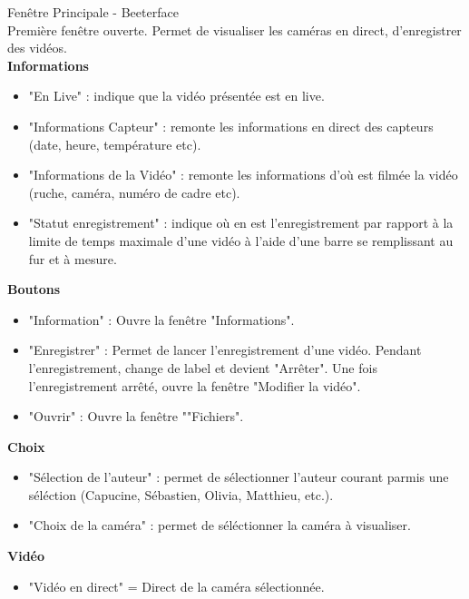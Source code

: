 \documentclass[11pt,french,a4paper]{report}
\begin{document}
\Large Fenêtre Principale - Beeterface \normalsize \\
    Première fenêtre ouverte. Permet de visualiser les caméras en direct, d'enregistrer
    des vidéos. \\
            \large \textbf{Informations} \normalsize
     \begin{itemize}[label=, leftmargin=*,parsep=0cm,itemsep=0cm,topsep=0cm]
        \item "En Live" : indique que la vidéo présentée est en live.
        \item "Informations Capteur" : remonte les informations en direct des capteurs (date, heure, température etc).
        \item "Informations de la Vidéo" : remonte les informations d'où est filmée la vidéo (ruche, caméra, numéro de cadre etc).
        \item "Statut enregistrement" : indique où en est l'enregistrement par rapport à la limite de temps maximale d'une vidéo à
               l'aide d'une barre se remplissant au fur et à mesure.
    \end{itemize}
            \large \textbf{Boutons} \normalsize
     \begin{itemize}[label=, leftmargin=*,parsep=0cm,itemsep=0cm,topsep=0cm]
        \item "Information" : Ouvre la fenêtre "Informations".
        \item "Enregistrer" : Permet de lancer l'enregistrement d'une vidéo. Pendant l'enregistrement, change de label et
        devient "Arrêter". Une fois l'enregistrement arrêté, ouvre la fenêtre "Modifier la vidéo".
        \item "Ouvrir" : Ouvre la fenêtre ""Fichiers".
    \end{itemize}
            \large \textbf{Choix} \normalsize
     \begin{itemize}[label=, leftmargin=*,parsep=0cm,itemsep=0cm,topsep=0cm]
        \item "Sélection de l'auteur" : permet de sélectionner l'auteur courant parmis une séléction (Capucine, Sébastien, Olivia, Matthieu, etc.).
        \item "Choix de la caméra" : permet de séléctionner la caméra à visualiser.
    \end{itemize}
            \large \textbf{Vidéo} \normalsize
     \begin{itemize}[label=, leftmargin=*,parsep=0cm,itemsep=0cm,topsep=0cm]
        \item "Vidéo en direct" = Direct de la caméra sélectionnée.
    \end{itemize}
\end{document}
